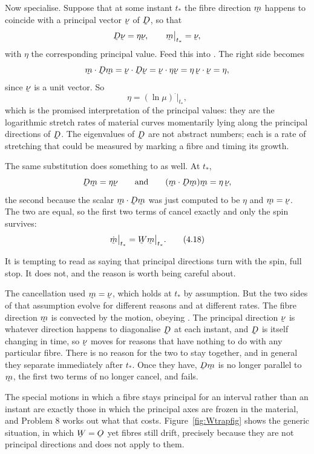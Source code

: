 Now specialise. Suppose that at some instant $t_{*}$ the fibre direction
$\bm$ happens to coincide with a principal vector $\bnu$ of $\bD$, so that
\[
   \bD\bnu=\eta\bnu ,\qquad \bm\big|_{t_{*}}=\bnu ,
\]
with $\eta$ the corresponding principal value. Feed this into .
The right side becomes
\[
   \ip\bm{\bD\bm}=\ip\bnu{\bD\bnu}=\ip\bnu{\eta\bnu}
   =\eta\,\ip\bnu\bnu=\eta ,
\]
since $\bnu$ is a unit vector. So
\begin{equation}
   \eta=(\ln\mu)^{\textstyle\cdot}\big|_{t_{*}} ,
   \tag{4.17}\label{eq:4.17}
\end{equation}
which is the promised interpretation of the principal values: they are the
logarithmic stretch rates of material curves momentarily lying along the
principal directions of $\bD$. The eigenvalues of $\bD$ are not abstract
numbers; each is a rate of stretching that could be measured by marking a
fibre and timing its growth.

The same substitution does something to  as well. At $t_{*}$,
\[
   \bD\bm=\eta\bnu
   \qquad\text{and}\qquad
   (\ip\bm{\bD\bm})\bm=\eta\,\bnu ,
\]
the second because the scalar $\ip\bm{\bD\bm}$ was just computed to be
$\eta$ and $\bm=\bnu$. The two are equal, so the first two terms of
 cancel exactly and only the spin survives:
\begin{equation}
   \dot\bm\big|_{t_{*}}=\bW\bm\big|_{t_{*}} .
   \tag{4.18}\label{eq:4.18}
\end{equation}

\begin{remark}\label{rem:instantonly}
It is tempting to read  as saying that principal directions turn
with the spin, full stop. It does not, and the reason is worth being
careful about.

The cancellation used $\bm=\bnu$, which holds at $t_{*}$ by assumption.
But the two sides of that assumption evolve for different reasons and at
different rates. The fibre direction $\bm$ is convected by the motion,
obeying . The principal direction $\bnu$ is whatever direction
happens to diagonalise $\bD$ at each instant, and $\bD$ is itself changing
in time, so $\bnu$ moves for reasons that have nothing to do with any
particular fibre. There is no reason for the two to stay together, and in
general they separate immediately after $t_{*}$. Once they have,
$\bD\bm$ is no longer parallel to $\bm$, the first two terms of 
no longer cancel, and  fails.

The special motions in which a fibre stays principal for an interval
rather than an instant are exactly those in which the principal axes are
frozen in the material, and Problem 8 works out what that costs.
Figure~\ref{fig:Wtrapfig} shows the generic situation, in which
$\bW=\Ob$ yet fibres still drift, precisely because they are not principal
directions and  does not apply to them.
\end{remark}

